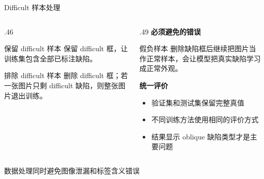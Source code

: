 \documentclass[aspectratio=169,10pt]{beamer}
\begin{document}
\begin{frame}{Difficult 样本处理}
  \begin{columns}[T,onlytextwidth]
    \begin{column}{.46\textwidth}
      \vspace{.35em}
      \begin{block}{保留 difficult 样本}
        保留 difficult 框，让训练集包含全部已标注缺陷。
      \end{block}

      \vspace{.55em}
      \begin{block}{排除 difficult 样本}
        删除 difficult 框；若一张图片只剩 difficult 缺陷，则整张图片退出训练。
      \end{block}
    \end{column}
    \begin{column}{.49\textwidth}
      \textbf{必须避免的错误}

      \vspace{.5em}
      \begin{alertblock}{假负样本}
        删除缺陷框后继续把图片当作正常样本，会让模型把真实缺陷学习成正常外观。
      \end{alertblock}

      \vspace{.55em}
      \textbf{统一评价}
      \begin{itemize}
        \item 验证集和测试集保留完整真值
        \item 不同训练方法使用相同的评价方式
        \item 结果显示 oblique 缺陷类型才是主要问题
      \end{itemize}
    \end{column}
  \end{columns}

  \vfill
  \centering
  \textcolor{seugreen}{\large 数据处理同时避免图像泄漏和标签含义错误}
\end{frame}

\end{document}

